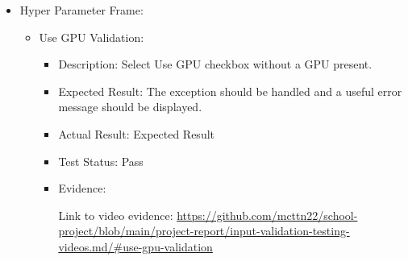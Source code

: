 \documentclass[./project-report/src/latex/project-report.tex]{subfiles}
\begin{document}
\begin{itemize}
    \item Hyper Parameter Frame:
    \label{sec:hyper-parameter-frame-input-validation}
    \begin{itemize}
        \item Use GPU Validation:
            \begin{itemize}
                \item Description: Select Use GPU checkbox without a GPU present.
                \item Expected Result: The exception should be handled and a useful error message should be displayed.
                \item Actual Result: Expected Result
                \item Test Status: Pass
                \item Evidence:
                    \begin{figure}[h!]
                    \centering
                    \end{figure}

                    Link to video evidence: \url{https://github.com/mcttn22/school-project/blob/main/project-report/input-validation-testing-videos.md/#use-gpu-validation}
            \end{itemize}

        \pagebreak


\end{itemize}
\end{itemize}
\end{document}
